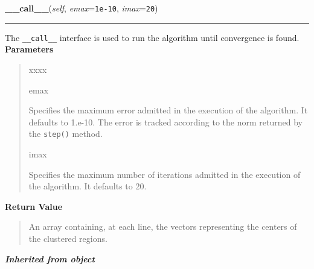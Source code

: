     \label{peach:fuzzy:cmeans:FuzzyCMeans:__call__}

    \vspace{0.5ex}

\hspace{.8\funcindent}\begin{boxedminipage}{\funcwidth}

    \raggedright \textbf{\_\_call\_\_}(\textit{self}, \textit{emax}={\tt 1e-10}, \textit{imax}={\tt 20})

    \vspace{-1.5ex}

    \rule{\textwidth}{0.5\fboxrule}
\setlength{\parskip}{2ex}

The \texttt{\_\_call\_\_} interface is used to run the algorithm until
convergence is found.
\setlength{\parskip}{1ex}
      \textbf{Parameters}
      \vspace{-1ex}

      \begin{quote}
        \begin{Ventry}{xxxx}

          \item[emax]


Specifies the maximum error admitted in the execution of the
algorithm. It defaults to 1.e-10. The error is tracked according to
the norm returned by the \texttt{step()} method.
          \item[imax]


Specifies the maximum number of iterations admitted in the execution
of the algorithm. It defaults to 20.
        \end{Ventry}

      \end{quote}

      \textbf{Return Value}
    \vspace{-1ex}

      \begin{quote}

An array containing, at each line, the vectors representing the
centers of the clustered regions.
      \end{quote}

    \end{boxedminipage}


\large{\textbf{\textit{Inherited from object}}}

